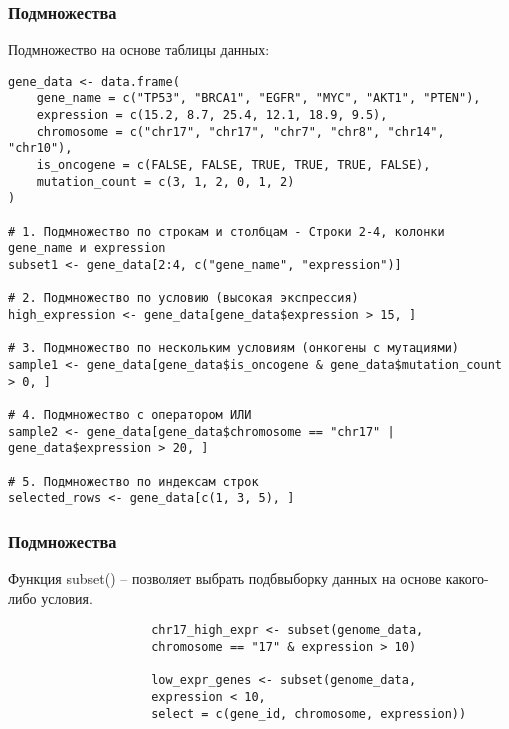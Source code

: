 \documentclass[10pt]{beamer}
\begin{document}
	\begin{frame}[fragile]
		\frametitle{Подмножества}
		Подмножество на основе таблицы данных:
		{\fontsize{7}{7}\selectfont
				\begin{verbatim}
gene_data <- data.frame(
    gene_name = c("TP53", "BRCA1", "EGFR", "MYC", "AKT1", "PTEN"),
    expression = c(15.2, 8.7, 25.4, 12.1, 18.9, 9.5),
    chromosome = c("chr17", "chr17", "chr7", "chr8", "chr14", "chr10"),
    is_oncogene = c(FALSE, FALSE, TRUE, TRUE, TRUE, FALSE),
    mutation_count = c(3, 1, 2, 0, 1, 2)
)
					
# 1. Подмножество по строкам и столбцам - Строки 2-4, колонки gene_name и expression
subset1 <- gene_data[2:4, c("gene_name", "expression")]
					
# 2. Подмножество по условию (высокая экспрессия)
high_expression <- gene_data[gene_data$expression > 15, ]
					
# 3. Подмножество по нескольким условиям (онкогены с мутациями)
sample1 <- gene_data[gene_data$is_oncogene & gene_data$mutation_count > 0, ]
					
# 4. Подмножество с оператором ИЛИ
sample2 <- gene_data[gene_data$chromosome == "chr17" | gene_data$expression > 20, ]
					
# 5. Подмножество по индексам строк
selected_rows <- gene_data[c(1, 3, 5), ]   \end{verbatim}
		}
		
		
	\end{frame}
	
	\begin{frame}[fragile]
		\frametitle{Подмножества}
		Функция subset() – позволяет выбрать подбвыборку данных на основе какого-либо условия.
		{\fontsize{8}{9}\selectfont
			
				\begin{verbatim}
					chr17_high_expr <- subset(genome_data, 
					chromosome == "17" & expression > 10)
					
					low_expr_genes <- subset(genome_data, 
					expression < 10, 
					select = c(gene_id, chromosome, expression))\end{verbatim}
			
		}
		
		
	\end{frame}
	
\end{document}
